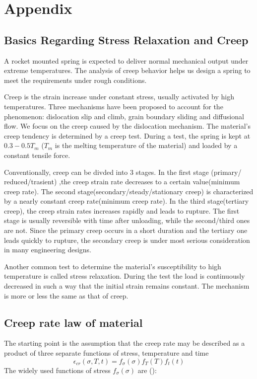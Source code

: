 \documentclass[10pt]{article}
\begin{document}
\section{Appendix}
\label{sec:Appendix}

\subsection{Basics Regarding Stress Relaxation and Creep}

A rocket mounted spring is expected to deliver normal mechanical output under extreme temperatures. The analysis of creep behavior helps us design a spring to meet the requirements under rough conditions.

Creep is the strain increase under constant stress, usually activated by high temperatures. Three mechanisms have been proposed to account for the phenomenon: dislocation slip and climb, grain boundary sliding and diffusional flow. We focus on the creep caused by the dislocation mechanism. The material's creep tendency is determined by a creep test. During a test, the spring is kept at $0.3-0.5T_m$ ($T_m$ is the melting temperature of the material) and loaded by a constant tensile force.

Conventionally, creep can be divded into $3$ stages. In the first stage (primary/ reduced/trasient) ,the creep strain rate decreases to a certain value(minimum creep rate). The second stage(secondary/steady/stationary creep) is characterized by a nearly constant creep rate(minimum creep rate). In the third stage(tertiary creep), the creep strain rates increases rapidly and leads to rupture. The first stage is usually reversible with time after unloading, while the second/third ones are not. Since the primary creep occurs in a short duration and the tertiary one leads quickly to rupture, the secondary creep is under most serious consideration in many engineering designs.

Another common test to determine the material's susceptibility to high temperature is called stress relaxation. During the test the load is continuously decreased in such a way that the initial strain remains constant. The mechanism is more or less the same as that of creep.

\subsection{Creep rate law of material}
\label{sec:Creep}
The starting point is the assumption that the creep rate may be described as a product of three separate functions of stress, temperature and time
\[
\epsilon_{cr}(\sigma,T,t)=f_\sigma (\sigma) f_T(T) f_t(t)
\]
The widely used functions of stress $f_\sigma(\sigma)$ are (\cite{Creep}):
\end{document}
